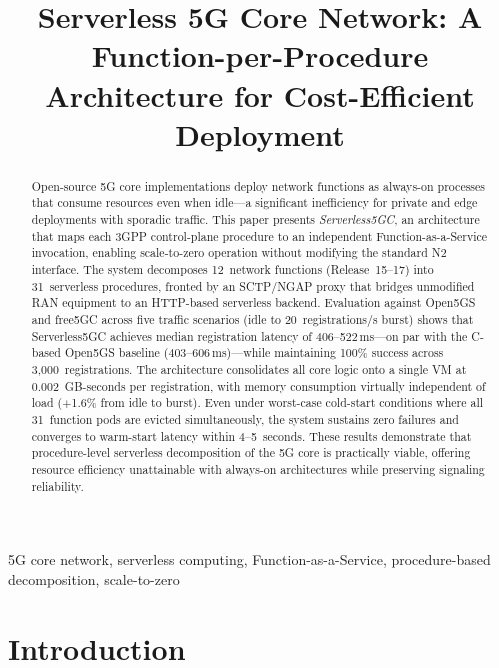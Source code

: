 \documentclass[conference]{IEEEtran}
\begin{document}
\title{Serverless 5G Core Network: A Function-per-Procedure Architecture for Cost-Efficient Deployment}

\author{
}

\maketitle

\begin{abstract}
Open-source 5G core implementations deploy network functions as always-on processes that consume resources even when idle---a significant inefficiency for private and edge deployments with sporadic traffic. This paper presents \textit{Serverless5GC}, an architecture that maps each 3GPP control-plane procedure to an independent Function-as-a-Service invocation, enabling scale-to-zero operation without modifying the standard N2 interface. The system decomposes 12~network functions (Release~15--17) into 31~serverless procedures, fronted by an SCTP/NGAP proxy that bridges unmodified RAN equipment to an HTTP-based serverless backend. Evaluation against Open5GS and free5GC across five traffic scenarios (idle to 20~registrations/s burst) shows that Serverless5GC achieves median registration latency of 406--522\,ms---on par with the C-based Open5GS baseline (403--606\,ms)---while maintaining 100\% success across 3{,}000~registrations. The architecture consolidates all core logic onto a single VM at 0.002~GB-seconds per registration, with memory consumption virtually independent of load ($+$1.6\% from idle to burst). Even under worst-case cold-start conditions where all 31~function pods are evicted simultaneously, the system sustains zero failures and converges to warm-start latency within 4--5~seconds. These results demonstrate that procedure-level serverless decomposition of the 5G core is practically viable, offering resource efficiency unattainable with always-on architectures while preserving signaling reliability.
\end{abstract}

\begin{IEEEkeywords}
5G core network, serverless computing, Function-as-a-Service, procedure-based decomposition, scale-to-zero
\end{IEEEkeywords}

\section{Introduction}
\label{sec:introduction}
\end{document}
